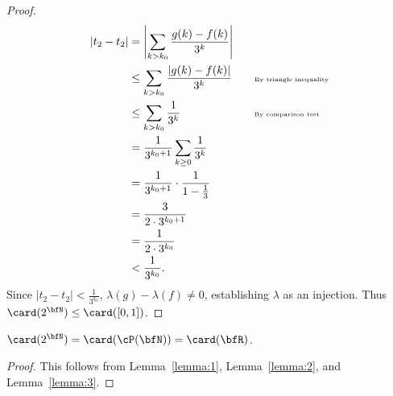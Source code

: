 \begin{proof}
                \begin{equation*}
                \begin{split}
                    |t_2 - t_2|
                    & = \left| \sum_{k > k_0} \frac{g(k)-f(k)}{3^k}\right| \\
                    & \leq \sum_{k > k_0} \frac{|g(k)-f(k)|}{3^k} \quad \quad \text{\tiny By triangle inequality}\\
                    & \leq \sum_{k > k_0} \frac{1}{3^k} \quad \quad \quad \quad \quad \quad \hspace{5.3pt}\text{\tiny By comparison test}\\
                    & = \frac{1}{3^{k_0 + 1}}\sum_{k \geq 0}\frac{1}{3^k} \\
                    & = \frac{1}{3^{k_0 + 1}} \cdot \frac{1}{1-\frac{1}{3}} \\
                    & = \frac{3}{2 \cdot 3^{k_0 + 1}} \\
                    & = \frac{1}{2\cdot 3^{k_0}} \\
                    & < \frac{1}{3^{k_0}}.
                \end{split}
                \end{equation*}
            Since $|t_2 - t_2| < \frac{1}{3^{k_0}}$, $\lambda(g) - \lambda(f) \neq 0$, establishing $\lambda$ as an injection. Thus $\card(2^\bfN) \leq \card([0,1])$.
        \end{proof}
    
    \begin{theorem}
        $\card(2^\bfN) = \card(\cP(\bfN)) = \card(\bfR)$.
    \end{theorem}
        \begin{proof}
            This follows from Lemma~\ref{lemma:1}, Lemma~\ref{lemma:2}, and Lemma~\ref{lemma:3}.
        \end{proof}
    